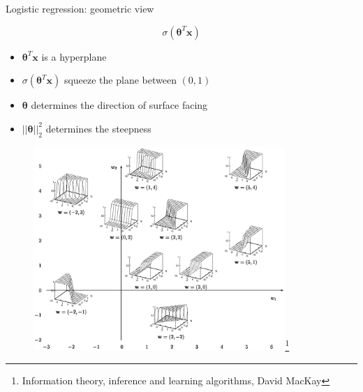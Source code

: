 \documentclass[ignorenonframetext,]{beamer}
\providecommand{\tightlist}{%
  \setlength{\itemsep}{0pt}\setlength{\parskip}{0pt}}
\newcommand{\vv}[1]{\boldsymbol{#1}}
\begin{document}
\begin{frame}{Logistic regression: geometric view}
\protect\hypertarget{logistic-regression-geometric-view}{}

\[\sigma(\vv{\theta}^T\vv{x})\]

\begin{itemize}
\tightlist
\item
  \(\vv{\theta}^T\vv{x}\) is a hyperplane
\item
  \(\sigma(\vv{\theta}^T\vv{x})\) squeeze the plane between \((0, 1)\)
\item
  \(\vv{\theta}\) determines the direction of surface facing
\item
  \(||\vv{\theta}||_2^2\) determines the steepness
\end{itemize}

\end{frame}

\begin{frame}{}
\protect\hypertarget{section-1}{}

\begin{figure}
    \centering
    \includegraphics[width = 0.85\textwidth]{./figs/figure260.eps}\footnote{Information theory, inference and learning algorithms, David MacKay}
\end{figure}

\end{frame}
\end{document}
